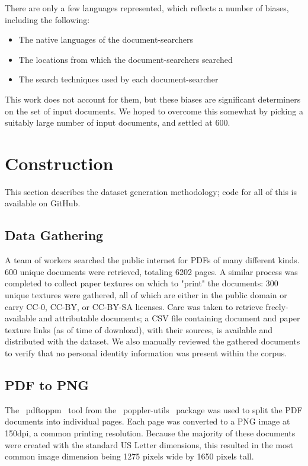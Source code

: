 \documentclass[runningheads]{llncs}
\begin{document}
There are only a few languages represented, which reflects a number of biases, including the following:
\begin{itemize}
\item The native languages of the document-searchers
\item The locations from which the document-searchers searched
\item The search techniques used by each document-searcher
\end{itemize}

This work does not account for them, but these biases are significant determiners on the set of input documents. We hoped to overcome this somewhat by picking a suitably large number of input documents, and settled at 600.

\section{Construction}
This section describes the dataset generation methodology; code for all of this is available on GitHub.

\subsection{Data Gathering}
A team of workers searched the public internet for PDFs of many different kinds. 600 unique documents were retrieved, totaling 6202 pages. A similar process was completed to collect paper textures on which to "print" the documents: 300 unique textures were gathered, all of which are either in the public domain or carry CC-0, CC-BY, or CC-BY-SA licenses. Care was taken to retrieve freely-available and attributable documents; a CSV file containing document and paper texture links (as of time of download), with their sources, is available and distributed with the dataset. We also manually reviewed the gathered documents to verify that no personal identity information was present within the corpus.

\subsection{PDF to PNG}
The ~pdftoppm~ tool from the ~poppler-utils~ package was used to split the PDF documents into individual pages. Each page was converted to a PNG image at 150dpi, a common printing resolution. Because the majority of these documents were created with the standard US Letter dimensions, this resulted in the most common image dimension being 1275 pixels wide by 1650 pixels tall.
\end{document}
